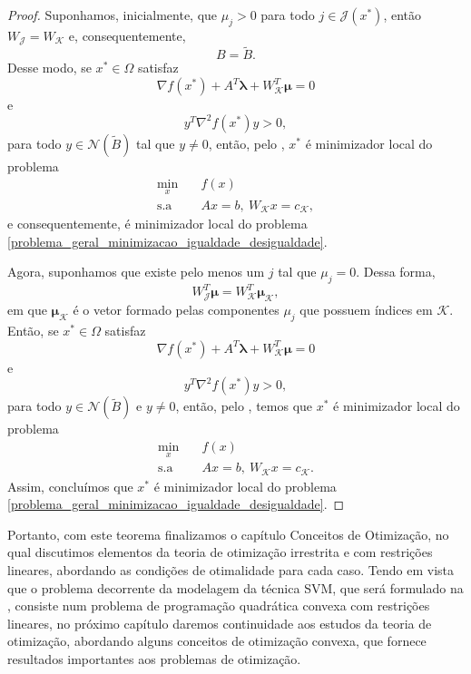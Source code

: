 \documentclass[12pt,a4paper]{scrartcl}
\theoremstyle{definition}%
\begin{document}
\begin{proof}
Suponhamos, inicialmente, que $\mu_{j} >0$ para todo $j\in \mathcal{J}(x^{*})$, então $W_{\mathcal{J}} = W_{\mathcal{K}}$ e, consequentemente, 
\[
B = \tilde{B} .
\]
Desse modo, se $x^{*} \in \Omega$ satisfaz
\[
\nabla f(x^{*}) + A^{T}\boldsymbol{\lambda} + W^{T}_{\mathcal{K}} \boldsymbol{\mu} =0
\]
e
\[
y^{T}\nabla^{2} f(x^{*})y >0,
\]
para todo $y\in \mathcal{N}(\tilde{B})$ tal que $y\neq 0$, então, pelo , $x^{*}$ é minimizador local do problema
\[ 
\begin{aligned}
\min_{x} & \quad f(x) \\
\text{s.a} & \quad Ax=b, \ W_{\mathcal{K}}x=c_{\mathcal{K}} ,
\end{aligned}
\]
e consequentemente, é minimizador local do problema \eqref{problema_geral_minimizacao_igualdade_desigualdade}.

Agora, suponhamos que existe pelo menos um $j$ tal que $\mu_{j} =0$. Dessa forma, 
\[
W_{\mathcal{J}}^{T}\boldsymbol{\mu} = W_{\mathcal{K}}^{T}\boldsymbol{\mu}_{\mathcal{K}} ,
\]
em que $\boldsymbol{\mu}_{\mathcal{K}}$ é o vetor formado pelas componentes $\mu_{j}$ que possuem índices em $\mathcal{K}$. Então, se $x^{*} \in \Omega$ satisfaz
\[
\nabla f(x^{*}) + A^{T}\boldsymbol{\lambda} + W^{T}_{\mathcal{K}} \boldsymbol{\mu} =0
\]
e
\[
y^{T}\nabla^{2} f(x^{*})y >0,
\]
para todo $y\in \mathcal{N}(\tilde{B})$ e $y\neq 0$, então, pelo , temos que $x^{*}$ é minimizador local do problema
\[ 
\begin{aligned}
\min_{x} & \quad f(x) \\
\text{s.a} & \quad Ax=b, \ W_{\mathcal{K}}x=c_{\mathcal{K}} .
\end{aligned}
\]
Assim, concluímos que $x^{*}$ é minimizador local do problema \eqref{problema_geral_minimizacao_igualdade_desigualdade}.
\end{proof}

Portanto, com este teorema finalizamos o capítulo Conceitos de Otimização, no qual discutimos elementos da teoria de otimização irrestrita e com restrições lineares, abordando as condições de otimalidade para cada caso. Tendo em vista que o problema decorrente da modelagem da técnica SVM, que será formulado na , consiste num problema de programação quadrática convexa com restrições lineares, no próximo capítulo daremos continuidade aos estudos da teoria de otimização, abordando alguns conceitos de otimização convexa, que fornece resultados importantes aos problemas de otimização.
\end{document}
